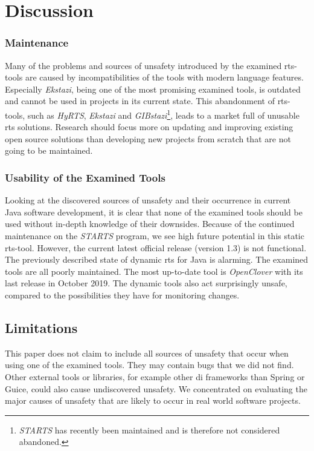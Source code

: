 \section{Discussion}
\subsubsection{Maintenance}
Many of the problems and sources of unsafety introduced by the examined \ac{rts}-tools are caused by
incompatibilities of the tools with modern language features. Especially \emph{Ekstazi}, being one of the
most promising examined tools, is outdated and cannot be used in projects in its current state.
This abandonment of \ac{rts}-tools, such as \emph{HyRTS}, \emph{Ekstazi} and \emph{GIBstazi}\footnote{\emph{STARTS} has recently
    been maintained and is therefore not considered abandoned.}, leads to a market full of
unusable \ac{rts} solutions. Research should focus more on updating and improving existing open
source solutions than developing new projects from scratch that are not going to be maintained.

\subsubsection{Usability of the Examined Tools}
Looking at the discovered sources of unsafety and their occurrence in current Java software development,
it is clear that none of the examined tools should be used without in-depth knowledge of their
downsides. Because of the continued maintenance on the \emph{STARTS} program, we see high future potential in
this static \ac{rts}-tool. However, the current latest official release (version 1.3) is not functional. The
previously described state of dynamic \ac{rts} for Java is alarming. The examined tools are all
poorly maintained. The most up-to-date tool is \emph{OpenClover} with its last release in October 2019.
The dynamic tools also act surprisingly unsafe, compared to the possibilities they have for monitoring changes.

\subsection{Limitations}
This paper does not claim to include all sources of unsafety that occur when using one of the
examined tools. They may contain bugs that we did not find. Other external tools or libraries, for example other
\ac{di} frameworks than Spring or Guice, could also cause undiscovered unsafety. We concentrated on
evaluating the major causes of unsafety that are likely to occur in real world software projects.

